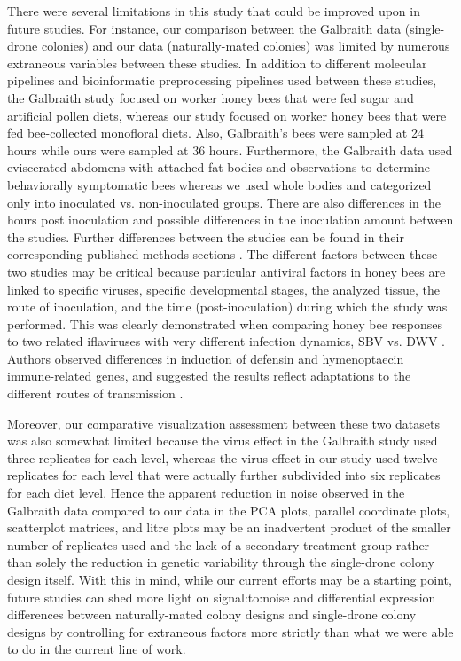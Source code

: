 \documentclass{bmcart}
\begin{document}
\begin{linenumbers}
\begin{doublespacing}
There were several limitations in this study that could be improved upon in future studies. For instance, our comparison between the Galbraith data (single-drone colonies) and our data (naturally-mated colonies) was limited by numerous extraneous variables between these studies. In addition to different molecular pipelines and bioinformatic preprocessing pipelines used between these studies, the Galbraith study focused on worker honey bees that were fed sugar and artificial pollen diets, whereas our study focused on worker honey bees that were fed bee-collected monofloral diets. Also, Galbraith’s bees were sampled at 24 hours while ours were sampled at 36 hours. Furthermore, the Galbraith data used eviscerated abdomens with attached fat bodies and observations to determine behaviorally symptomatic bees whereas we used whole bodies and categorized only into inoculated vs. non-inoculated groups. There are also differences in the hours post inoculation and possible differences in the inoculation amount between the studies. Further differences between the studies can be found in their corresponding published methods sections \cite{adamInt, galbraith}. The different factors between these two studies may be critical because particular antiviral factors in honey bees are linked to specific viruses, specific developmental stages, the analyzed tissue, the route of inoculation, and the time (post-inoculation) during which the study was performed. This was clearly demonstrated when comparing honey bee responses to two related iflaviruses with very different infection dynamics, SBV vs. DWV \cite{Ryabov}. Authors observed differences in induction of defensin and hymenoptaecin immune-related genes, and suggested the results reflect adaptations to the different routes of transmission \cite{Ryabov}. 

Moreover, our comparative visualization assessment between these two datasets was also somewhat limited because the virus effect in the Galbraith study used three replicates for each level, whereas the virus effect in our study used twelve replicates for each level that were actually further subdivided into six replicates for each diet level. Hence the apparent reduction in noise observed in the Galbraith data compared to our data in the PCA plots, parallel coordinate plots, scatterplot matrices, and litre plots may be an inadvertent product of the smaller number of replicates used and the lack of a secondary treatment group rather than solely the reduction in genetic variability through the single-drone colony design itself. With this in mind, while our current efforts may be a starting point, future studies can shed more light on signal:to:noise and differential expression differences between naturally-mated colony designs and single-drone colony designs by controlling for extraneous factors more strictly than what we were able to do in the current line of work. 


\end{doublespacing}
\end{linenumbers}
\end{document}
